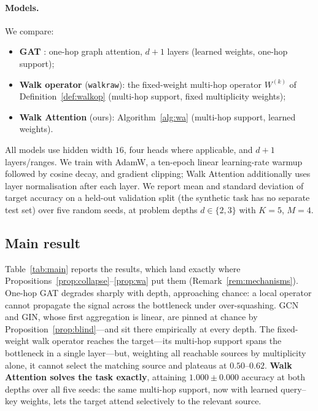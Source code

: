 \paragraph{Models.} We compare:
\begin{itemize}
  \item \textbf{GAT} \cite{velickovic2017graph}: one-hop graph attention, $d{+}1$
  layers (learned weights, one-hop support);
  \item \textbf{Walk operator} (\texttt{walkraw}): the fixed-weight multi-hop
  operator $W^{(k)}$ of Definition~\ref{def:walkop} (multi-hop support, fixed
  multiplicity weights);
  \item \textbf{Walk Attention} (ours): Algorithm~\ref{alg:wa} (multi-hop
  support, learned weights).
\end{itemize}
All models use hidden width $16$, four heads where applicable, and $d{+}1$
layers/ranges. We train with AdamW, a ten-epoch linear learning-rate warmup
followed by cosine decay, and gradient clipping; Walk Attention additionally uses
layer normalisation after each layer. We report mean and standard deviation of
target accuracy on a held-out validation split (the synthetic task has no
separate test set) over five random seeds, at problem depths $d\in\{2,3\}$ with
$K=5$, $M=4$.

\subsection{Main result}

Table~\ref{tab:main} reports the results, which land exactly where
Propositions~\ref{prop:collapse}--\ref{prop:wa} put them
(Remark~\ref{rem:mechanisms}). One-hop GAT degrades sharply with depth,
approaching chance: a local operator cannot propagate the signal across the
bottleneck under over-squashing. GCN and GIN, whose first aggregation is
linear, are pinned at chance by Proposition~\ref{prop:blind}---and sit there
empirically at every depth. The fixed-weight walk operator reaches the
target---its multi-hop support spans the bottleneck in a single layer---but,
weighting all reachable sources by multiplicity alone, it cannot select the
matching source and plateaus at $0.50$--$0.62$. \textbf{Walk Attention solves the
task exactly}, attaining $1.000\pm0.000$ accuracy at both depths over all five
seeds: the same multi-hop support, now with learned query--key weights, lets the
target attend selectively to the relevant source.

